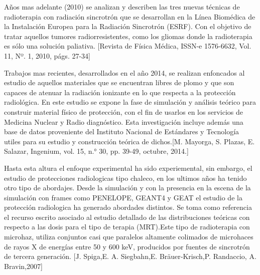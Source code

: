 \documentclass[a4paper,10pt]{article}
\begin{document}
Años mas adelante (2010) se analizan y
describen las tres nuevas técnicas de radioterapia con radiación sincrotrón que se desarrollan en la Línea Biomédica de la Instalación Europea para la Radiación Sincrotrón (ESRF). Con el objetivo de tratar aquellos tumores radiorresistentes, como los gliomas donde la radioterapia es sólo una solución paliativa. 
[Revista de Física Médica, ISSN-e 1576-6632, Vol. 11, Nº. 1, 2010, págs. 27-34]


Trabajos mas recientes, desarrollados en el año 2014, se realizan enfoncados al estudio de aquellos  materiales que se encuentran libres de plomo y que son capaces de atenuar la radiación ionizante en lo que respecta a la protección radiológica. En este estudio se expone la fase de simulación y análisis teórico para construir material físico  de protección, con el fin de usarlos en los  servicios de Medicina Nuclear y Radio diagnóstico. Esta investigación incluye además una base de datos proveniente del Instituto Nacional de Estándares y Tecnología utiles para su estudio y construcción teórica de dichos.[M. Mayorga, S. Plazas, E. Salazar, Ingenium, vol. 15, n.° 30, pp. 39-49, octubre, 2014.]




Hasta esta altura el enfoque experimental ha sido experiemental, sin embargo, el estudio de protecciones radiologicas tipo chaleco, en los ultimos años ha tenido otro tipo de abordajes. Desde la simulación y con la presencia en la escena de la simulación con frames como PENELOPE, GEANT4 y GEAT el estudio de la protección radiologica ha generado abordades distintos.
Se toma como referencia el recurso escrito asociado al estudio detallado de las  distribuciones teóricas con respecto a las dosis para el tipo de terapia (MRT).Este tipo de radioterapia con microhaz,  utiliza conjuntos casi que  paralelos altamente colimados de microhaces de rayos X de energías entre 50 y 600 keV, producidos por fuentes de sincrotrón de tercera generación. [J. Spiga,E. A. Siegbahn,E. Bräuer‐Krisch,P. Randaccio, A. Bravin,2007]
\end{document}
